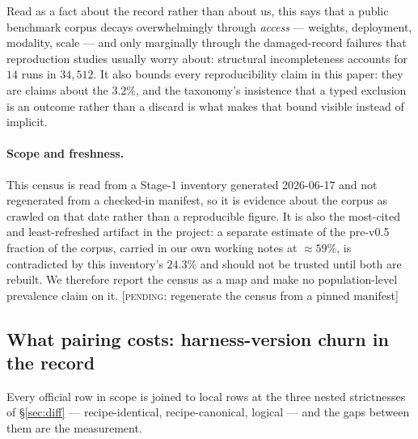 Read as a fact about the record rather than about us, this says that a public
benchmark corpus decays overwhelmingly through \emph{access} --- weights,
deployment, modality, scale --- and only marginally through the damaged-record
failures that reproduction studies usually worry about: structural incompleteness
accounts for $14$ runs in $34{,}512$. It also bounds every reproducibility claim
in this paper: they are claims about the $3.2\%$, and the taxonomy's insistence
that a typed exclusion is an outcome rather than a discard is what makes that
bound visible instead of implicit.

\paragraph{Scope and freshness.} This census is read from a Stage-1 inventory
generated 2026-06-17 and not regenerated from a checked-in manifest, so it is
evidence about the corpus as crawled on that date rather than a reproducible
figure. It is also the most-cited and least-refreshed artifact in the project: a
separate estimate of the pre-v0.5 fraction of the corpus, carried in our own
working notes at ${\approx}59\%$, is contradicted by this inventory's $24.3\%$ and
should not be trusted until both are rebuilt. We therefore report the census as a
map and make no population-level prevalence claim on it.
{\color{orange}\textsf{\small[\textsc{pending}: regenerate the census from a pinned
manifest]}}

\subsection{What pairing costs: harness-version churn in the record}
\label{sec:coverage}

Every official row in scope is joined to local rows at the three nested
strictnesses of \S\ref{sec:diff} --- recipe-identical, recipe-canonical, logical
--- and the gaps between them are the measurement.

